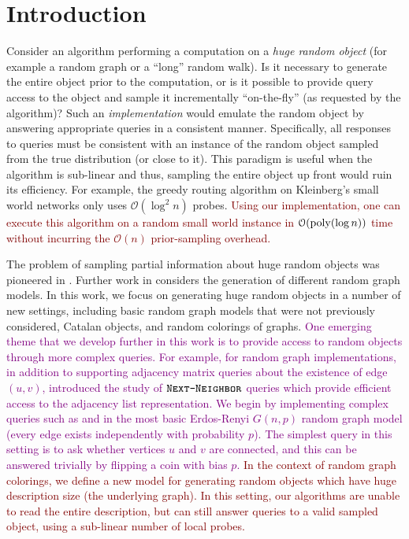 \section{Introduction}
Consider an algorithm performing a computation on a \emph{huge random object} (for example a random graph or a ``long'' random walk).
Is it necessary to generate the entire object prior to the computation,
or is it possible to provide query access to the object and sample it incrementally ``on-the-fly'' (as requested by the algorithm)?
Such an \emph{implementation} would emulate the random object by answering appropriate queries in a consistent manner.
Specifically, all responses to queries must be consistent with an instance of the random object sampled from the true distribution (or close to it).
This paradigm is useful when the algorithm is sub-linear and thus, sampling the entire object up front would ruin its efficiency.
For example, the greedy routing algorithm on Kleinberg's small world networks \cite{kleinberg} only uses $\mathcal O(\log^2 n)$ probes.
\textcolor{Maroon}{Using our implementation, one can execute this algorithm on a random small world instance
in $\mathcal O(\mathrm{poly}(\log n))$ time without incurring the $\mathcal O(n)$ prior-sampling overhead.}

The problem of sampling partial information about huge random objects was pioneered in \cite{huge,huge_old,huge_journal}.
Further work in \cite{sparse,reut} considers the generation of different random graph models.
In this work, we focus on generating huge random objects in a number of new settings,
including basic random graph models that were not previously considered, Catalan objects, and random colorings of graphs.
\textcolor{Purple}{
One emerging theme that we develop further in this work is to provide access to random objects through more complex queries.
For example, for random graph implementations, in addition to supporting adjacency matrix queries about the existence of edge $(u,v)$,
\cite{reut} introduced the study of $\texttt{\textsc{Next-Neighbor}}$ queries which provide efficient access to the adjacency list representation.
We begin by implementing complex queries such as  and 
in the most basic Erdos-Renyi $G(n,p)$ random graph model (every edge exists independently with probability $p$).
The simplest query in this setting is to ask whether vertices $u$ and $v$ are connected,
and this can be answered trivially by flipping a coin with bias $p$.
}
\textcolor{Maroon}{
In the context of random graph colorings, we define a new model for generating random objects which have huge description size (the underlying graph).
In this setting, our algorithms are unable to read the entire description,
but can still answer queries to a valid sampled object, using a sub-linear number of local probes.}





